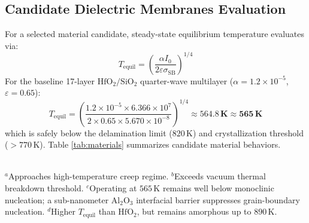 \documentclass[11pt, a4paper]{article}
\begin{document}
\subsection{Candidate Dielectric Membranes Evaluation}
For a selected material candidate, steady-state equilibrium temperature evaluates via:
\begin{equation}
    T_{\text{equil}} = \left( \frac{\alpha I_0}{2 \varepsilon \sigma_{\text{SB}}} \right)^{1/4}
\end{equation}
For the baseline 17-layer $\text{HfO}_2/\text{SiO}_2$ quarter-wave multilayer ($\alpha = 1.2 \times 10^{-5}$, $\varepsilon = 0.65$):
\begin{equation}
    T_{\text{equil}} = \left( \frac{1.2 \times 10^{-5} \times 6.366 \times 10^7}{2 \times 0.65 \times 5.670 \times 10^{-8}} \right)^{1/4} \approx \mathbf{564.8\,\text{K}} \approx \mathbf{565\,\text{K}}
\end{equation}
which is safely below the delamination limit ($820\,\text{K}$) and crystallization threshold ($> 770\,\text{K}$). Table \ref{tab:materials} summarizes candidate material behaviors.

\begin{table}[h]
\centering
\small
\setlength{\tabcolsep}{3.5pt}
\caption{Material Viability Matrix Under $100\,\text{MW}$ / $14\,\text{h}$ Drive ($\alpha_{\text{crit}} = 2.06 \times 10^{-5}$, $I_0 = 63.66\,\text{MW/m}^2$)}
\label{tab:materials}
\vspace{2mm}
\vspace{1mm}\\
\footnotesize{$^a$Approaches high-temperature creep regime. $^b$Exceeds vacuum thermal breakdown threshold. $^c$Operating at $565\,\text{K}$ remains well below monoclinic nucleation; a sub-nanometer $\text{Al}_2\text{O}_3$ interfacial barrier suppresses grain-boundary nucleation. $^d$Higher $T_{\text{equil}}$ than $\text{HfO}_2$, but remains amorphous up to $890\,\text{K}$.}
\end{table}
\end{document}
